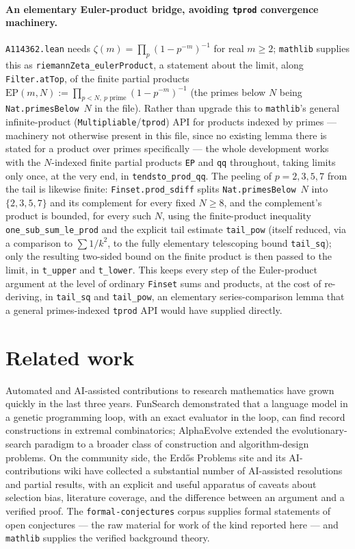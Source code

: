\documentclass[11pt]{article}
\theoremstyle{plain}
\theoremstyle{definition}
\theoremstyle{remark}
\numberwithin{equation}{section}
\begin{document}
\paragraph{An elementary Euler-product bridge, avoiding \texttt{tprod} convergence machinery.}
\texttt{A114362.lean} needs $\zeta(m) = \prod_p (1-p^{-m})^{-1}$ for real $m \ge 2$;
\texttt{mathlib} supplies this as \texttt{riemannZeta\_eulerProduct}, a statement about the limit,
along \texttt{Filter.atTop}, of the finite partial products $\mathrm{EP}(m,N) :=
\prod_{p < N,\ p\text{ prime}} (1-p^{-m})^{-1}$ (the primes below $N$ being
\texttt{Nat.primesBelow}~$N$ in the file). Rather than
upgrade this to \texttt{mathlib}'s general infinite-product (\texttt{Multipliable}/\texttt{tprod})
API for products indexed by primes --- machinery not otherwise present in this file, since no
existing lemma there is stated for a product over primes specifically --- the whole development
works with the $N$-indexed finite partial products \texttt{EP} and \texttt{qq} throughout, taking
limits only once, at the very end, in \texttt{tendsto\_prod\_qq}. The peeling of $p=2,3,5,7$ from
the tail is likewise finite: \texttt{Finset.prod\_sdiff} splits \texttt{Nat.primesBelow}~$N$ into
$\{2,3,5,7\}$ and its complement for every fixed $N \ge 8$, and the complement's product is
bounded, for every such $N$, using the finite-product inequality \texttt{one\_sub\_sum\_le\_prod}
and the explicit tail estimate \texttt{tail\_pow} (itself reduced, via a comparison to
$\sum 1/k^2$, to the fully elementary telescoping bound \texttt{tail\_sq}); only the resulting
two-sided bound on the finite product is then passed to the limit, in \texttt{t\_upper} and
\texttt{t\_lower}. This keeps every step of the Euler-product argument at the level of ordinary
\texttt{Finset} sums and products, at the cost of re-deriving, in \texttt{tail\_sq} and
\texttt{tail\_pow}, an elementary series-comparison lemma that a general primes-indexed
\texttt{tprod} API would have supplied directly.

\section{Related work}
\label{sec:related}

Automated and AI-assisted contributions to research mathematics have grown quickly in the last
three years. FunSearch \cite{funsearch} demonstrated that a language model in a genetic
programming loop, with an exact evaluator in the loop, can find record constructions in
extremal combinatorics; AlphaEvolve \cite{alphaevolve} extended the evolutionary-search paradigm
to a broader class of construction and algorithm-design problems. On the community side, the
Erd\H{o}s Problems site and its AI-contributions wiki \cite{erdosproblems} have collected a
substantial number of AI-assisted resolutions and partial results, with an explicit and useful
apparatus of caveats about selection bias, literature coverage, and the difference between an
argument and a verified proof. The \texttt{formal-conjectures} corpus \cite{formalconjectures}
supplies formal statements of open conjectures --- the raw material for work of the kind reported
here --- and \texttt{mathlib} \cite{mathlib} supplies the verified background theory.
\end{document}
